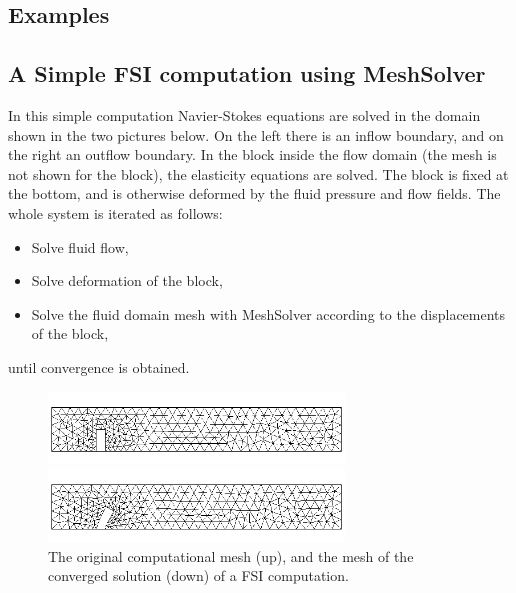 \begin{versiona}
\section{Examples}

\subsection{A Simple FSI computation using MeshSolver}

In this simple computation Navier-Stokes equations are solved in the
domain shown in the two pictures below. On the left there is an inflow
boundary, and on the right an outflow boundary. In the block inside
the flow domain (the mesh is not shown for the block), the elasticity
equations are solved. The block is fixed at the bottom, and is otherwise
deformed by the fluid pressure and flow fields. The whole system is
iterated as follows:
\begin{itemize}
\item Solve fluid flow,
\item Solve deformation of the block,
\item Solve the fluid domain mesh with MeshSolver  according to the displacements
   of the block,
\end{itemize}
until convergence is obtained.

\begin{figure}[tbhp]
  \centerline{\includegraphics[width=0.7\textwidth]{orig.png}}
  \centerline{\includegraphics[width=0.7\textwidth]{deform.png}}
  \caption{The original computational mesh (up), and the mesh of the converged solution (down) of a FSI
    computation.}
\end{figure}

%
%

\end{versiona}
